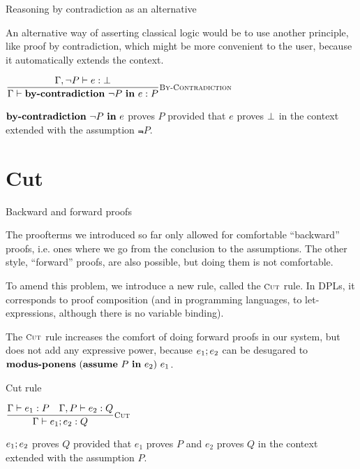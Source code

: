 \documentclass{beamer}
\begin{document}
\begin{frame}{Reasoning by contradiction as an alternative}

An alternative way of asserting classical logic would be to use another principle, like proof by contradiction, which might be more convenient to the user, because it automatically extends the context.

\vspace{2em}

\begin{center}
  $\infrule[By-Contradiction]{\proves[\assume{\Gamma}{\Not{P}}]{e}{\False}}{\proves{\bycontradiction{\Not{P}}{e}}{P}}$
\end{center}

\vspace{2em}

$\textbf{by-contradiction}\ \neg P\ \textbf{in}\ e$ proves $P$ provided that $e$ proves $\bot$ in the context extended with the assumption $\Not{P}$.

\end{frame}

\section{Cut}

\begin{frame}{Backward and forward proofs}

The proofterms we introduced so far only allowed for comfortable ``backward'' proofs, i.e. ones where we go from the conclusion to the assumptions. The other style, ``forward'' proofs, are also possible, but doing them is not comfortable.

\vspace{1em}

To amend this problem, we introduce a new rule, called the $\textsc{\footnotesize{Cut}}$ rule. In DPLs, it corresponds to proof composition (and in programming languages, to let-expressions, although there is no variable binding).

\vspace{1em}

The $\textsc{\footnotesize{Cut}}$ rule increases the comfort of doing forward proofs in our system, but does not add any expressive power, because $e_1; e_2$ can be desugared to $\textbf{modus-ponens}\ (\textbf{assume}\ P\ \textbf{in}\ e_2)\ e_1$.

\end{frame}

\begin{frame}{Cut rule}

\begin{center}
  $\infrule[Cut]{\proves{e_1}{P} \quad \proves[\assume{\Gamma}{P}]{e_2}{Q}}{\proves{\cut{e_1}{e_2}}{Q}}$
\end{center}

\vspace{2em}

$e_1; e_2$ proves $Q$ provided that $e_1$ proves $P$ and $e_2$ proves $Q$ in the context extended with the assumption $P$.

\end{frame}
\end{document}
